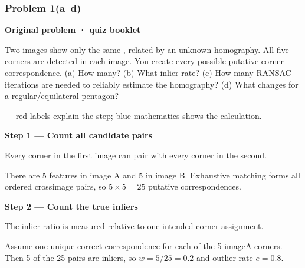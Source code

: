 \documentclass[letterpaper,11pt,english,openany,oneside]{jupyterBook}
\begin{document}
\subsubsection{Problem 1(a–d)}
\label{\detokenize{lectures/lecture03/quiz-workbook:problem-1-ad}}\label{\detokenize{lectures/lecture03/quiz-workbook:quiz-7-q1}}\label{\detokenize{lectures/lecture03/quiz-workbook:ex-lec03-symmetry}}\label{\detokenize{lectures/lecture03/quiz-workbook:ex-lec03-pentagon}}
\par\medskip\textbf{Original problem · quiz booklet}\par\smallskip

\sphinxAtStartPar
Two images show only the same , related by an unknown homography. All five corners are detected in each image. You create every possible putative corner correspondence. (a) How many? (b) What inlier rate? (c) How many RANSAC iterations are needed to reliably estimate the homography? (d) What changes for a regular/equilateral pentagon?

\par\medskip

\sphinxAtStartPar
{} — red labels explain the step; blue mathematics shows the calculation.

\par\medskip{}
{\color{QuizStepRed}\bfseries Step 1 — Count all candidate pairs}\par\smallskip

\sphinxAtStartPar
{} Every corner in the first image can pair with every corner in the second.

\sphinxAtStartPar
There are 5 features in image A and 5 in image B. Exhaustive matching forms all ordered cross\sphinxhyphen{}image pairs, so {\color{QuizMathBlue} \(\boxed{5\times5=25}\)} putative correspondences.

\par

\par\medskip{}
{\color{QuizStepRed}\bfseries Step 2 — Count the true inliers}\par\smallskip

\sphinxAtStartPar
{} The inlier ratio is measured relative to one intended corner assignment.

\sphinxAtStartPar
Assume one unique correct correspondence for each of the 5 image\sphinxhyphen{}A corners. Then 5 of the 25 pairs are inliers, so {\color{QuizMathBlue} \(\boxed{w=5/25=0.2}\)} and outlier rate {\color{QuizMathBlue} \(e=0.8\)}.
\end{document}

